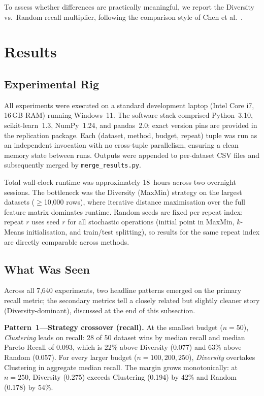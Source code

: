 \documentclass[sigconf,nonacm]{acmart}
\begin{document}
To assess whether differences are practically meaningful, we report the
Diversity vs.\ Random recall multiplier, following the comparison style of
Chen et al.~\cite{chen2019sampling}.

\section{Results}
\label{sec:results}

\subsection{Experimental Rig}
\label{sec:rig}

All experiments were executed on a standard development laptop
(Intel Core i7, 16\,GB RAM) running Windows~11.
The software stack comprised Python~3.10, scikit-learn~1.3, NumPy~1.24,
and pandas~2.0; exact version pins are provided in the replication package.
Each (dataset, method, budget, repeat) tuple was run as an independent
invocation with no cross-tuple parallelism, ensuring a clean memory state
between runs.
Outputs were appended to per-dataset CSV files and subsequently merged by
\texttt{merge\_results.py}.

Total wall-clock runtime was approximately 18~hours across two overnight
sessions.
The bottleneck was the Diversity (MaxMin) strategy on the largest datasets
($\geq$10,000 rows), where iterative distance maximisation over the full
feature matrix dominates runtime.
Random seeds are fixed per repeat index: repeat $r$ uses seed $r$ for all
stochastic operations (initial point in MaxMin, $k$-Means initialisation, and
train/test splitting), so results for the same repeat index are directly
comparable across methods.

\subsection{What Was Seen}
\label{sec:whatseen}

Across all 7,640 experiments, two headline patterns emerged on the primary
recall metric; the secondary metrics tell a closely related but slightly
cleaner story (Diversity-dominant), discussed at the end of this subsection.

\textbf{Pattern~1---Strategy crossover (recall).}
At the smallest budget ($n=50$), \emph{Clustering} leads on recall: 28 of 50
dataset wins by median recall and median Pareto Recall of 0.093, which is
22\% above Diversity (0.077) and 63\% above Random (0.057).
For every larger budget ($n = 100, 200, 250$), \emph{Diversity} overtakes
Clustering in aggregate median recall.
The margin grows monotonically: at $n=250$, Diversity (0.275) exceeds
Clustering (0.194) by 42\% and Random (0.178) by 54\%.
\end{document}
